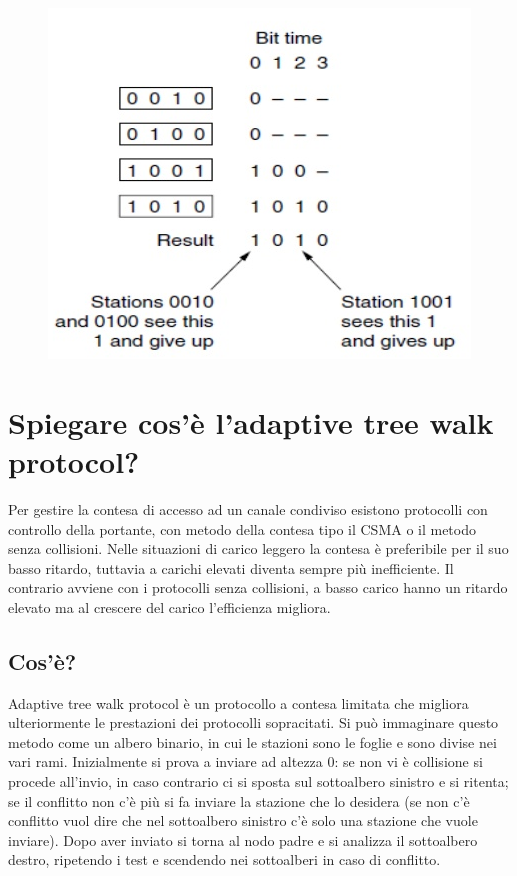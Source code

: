 \begin{figure}[H]
\centering
\includegraphics[scale=0.6]{res/img/25_FreeBinaryCountdown.png}
\end{figure} 

\section{Spiegare cos'è l'adaptive tree walk protocol?}

Per gestire la contesa di accesso ad un canale condiviso esistono protocolli con controllo della portante, con metodo della contesa tipo il CSMA o il metodo senza collisioni. Nelle situazioni di carico leggero la contesa è preferibile per il suo basso ritardo, tuttavia a carichi elevati diventa sempre più inefficiente. Il contrario avviene con i protocolli senza collisioni, a basso carico hanno un ritardo elevato ma al crescere del carico l'efficienza migliora.
\subsection{Cos'è?}
Adaptive tree walk protocol è un protocollo a contesa limitata che migliora ulteriormente le prestazioni dei protocolli sopracitati.
Si può immaginare questo metodo come un albero binario, in cui le stazioni sono le foglie e sono divise nei vari rami. Inizialmente si prova a inviare ad altezza 0: se non vi è collisione si procede all'invio, in caso contrario ci si sposta sul sottoalbero sinistro e si ritenta; se il conflitto non c'è più si fa inviare la stazione che lo desidera (se non c'è conflitto vuol dire che nel sottoalbero sinistro c'è solo una stazione che vuole inviare). Dopo aver inviato si torna al nodo padre e si analizza il sottoalbero destro, ripetendo i test e scendendo nei sottoalberi in caso di conflitto.

